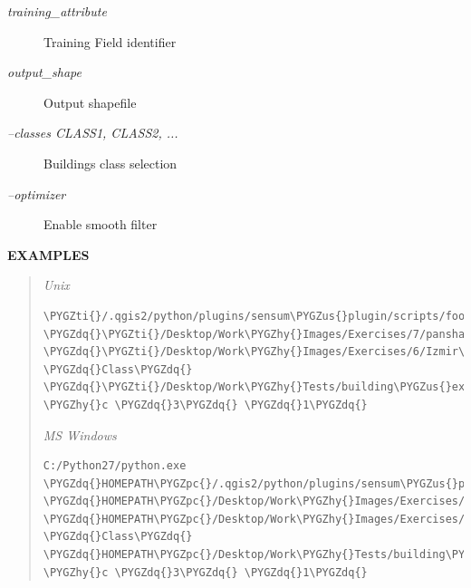 \documentclass[letterpaper,10pt,english]{sphinxmanual}
\def\PYGZus{\char`\_}
\def\PYGZpc{\char`\%}
\def\PYGZhy{\char`\-}
\def\PYGZdq{\char`\"}
\def\PYGZti{\char`\~}
\begin{document}
\begin{description}
\begin{description}
\item[{\emph{training\_attribute}}] \leavevmode
Training Field identifier

\item[{\emph{output\_shape}}] \leavevmode
Output shapefile

\item[{\emph{--classes CLASS1, CLASS2, ...}}] \leavevmode
Buildings class selection

\item[{\emph{--optimizer}}] \leavevmode
Enable smooth filter

\end{description}

\end{description}

\textbf{EXAMPLES}
\begin{quote}

\emph{Unix}

\begin{Verbatim}[frame=single,commandchars=\\\{\}]
\PYGZti{}/.qgis2/python/plugins/sensum\PYGZus{}plugin/scripts/footprints.py \PYGZdq{}\PYGZti{}/Desktop/Work\PYGZhy{}Images/Exercises/7/pansharp.tif\PYGZdq{} \PYGZdq{}\PYGZti{}/Desktop/Work\PYGZhy{}Images/Exercises/6/Izmir\PYGZus{}low\PYGZus{}residential\PYGZus{}small\PYGZus{}patches\PYGZus{}footprints\PYGZus{}rpj.shp\PYGZdq{} \PYGZdq{}Class\PYGZdq{} \PYGZdq{}\PYGZti{}/Desktop/Work\PYGZhy{}Tests/building\PYGZus{}extraction.shp\PYGZdq{}  \PYGZhy{}c \PYGZdq{}3\PYGZdq{} \PYGZdq{}1\PYGZdq{}
\end{Verbatim}

\emph{MS Windows}

\begin{Verbatim}[frame=single,commandchars=\\\{\}]
C:/Python27/python.exe \PYGZdq{}HOMEPATH\PYGZpc{}/.qgis2/python/plugins/sensum\PYGZus{}plugin/scripts/footprints.py\PYGZdq{} \PYGZdq{}HOMEPATH\PYGZpc{}/Desktop/Work\PYGZhy{}Images/Exercises/7/pansharp.tif\PYGZdq{} \PYGZdq{}HOMEPATH\PYGZpc{}/Desktop/Work\PYGZhy{}Images/Exercises/6/Izmir\PYGZus{}low\PYGZus{}residential\PYGZus{}small\PYGZus{}patches\PYGZus{}footprints\PYGZus{}rpj.shp\PYGZdq{} \PYGZdq{}Class\PYGZdq{} \PYGZdq{}HOMEPATH\PYGZpc{}/Desktop/Work\PYGZhy{}Tests/building\PYGZus{}extraction.shp\PYGZdq{}  \PYGZhy{}c \PYGZdq{}3\PYGZdq{} \PYGZdq{}1\PYGZdq{}
\end{Verbatim}
\end{quote}
\end{document}
